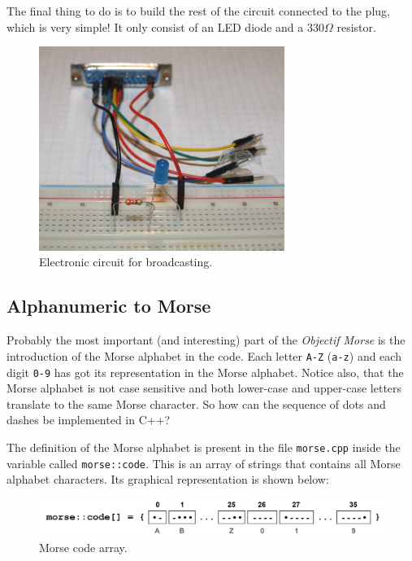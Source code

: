 \documentclass[12pt]{report}
\begin{document}
The final thing to do is to build the rest of the circuit connected to the plug, which is very simple! It only consist of an LED diode and a 330$\Omega$ resistor.

\begin{figure}[H]
\centering\includegraphics[width=8cm]{broadcast_circuit}
\caption{Electronic circuit for broadcasting.}				
\label{fig:broadcast_circuit}
\end{figure}

\subsection{Alphanumeric to Morse} \label{sec:asciitomorse}

Probably the most important (and interesting) part of the \textit{Objectif Morse} is the introduction of the Morse alphabet in the code. Each letter \verb|A-Z| (\verb|a-z|) and each digit \verb|0-9| has got its representation in the Morse alphabet. Notice also, that the Morse alphabet is not case sensitive and both lower-case and upper-case letters translate to the same Morse character. So how can the sequence of dots and dashes be implemented in C++?

The definition of the Morse alphabet is present in the file \verb|morse.cpp| inside the variable called \verb|morse::code|. This is an array of strings that contains all Morse alphabet characters. Its graphical representation is shown below:

\begin{figure}[H]
\centering\includegraphics[scale=0.1]{morse--code}
\caption{Morse code array.}				
\label{fig:morse_code_array}
\end{figure}
\end{document}
